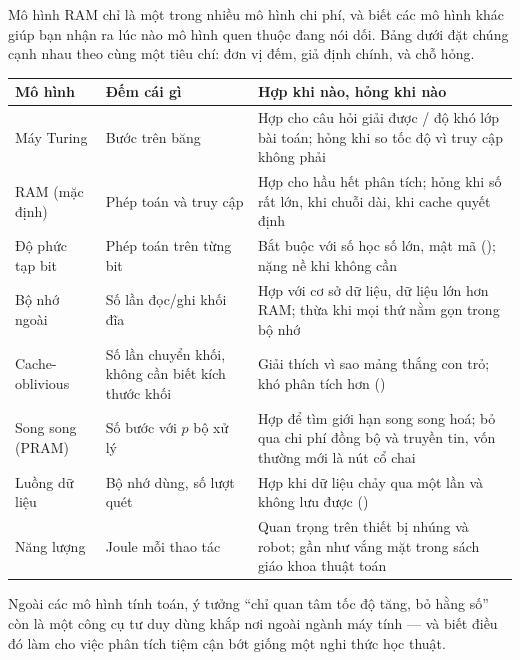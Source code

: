 \documentclass[../../algorithm.tex]{subfiles}
\begin{document}
Mô hình RAM chỉ là một trong nhiều mô hình chi phí, và biết các mô hình khác giúp bạn nhận ra lúc nào mô hình quen thuộc đang nói dối. Bảng dưới đặt chúng cạnh nhau theo cùng một tiêu chí: đơn vị đếm, giả định chính, và chỗ hỏng.

\begin{center}\footnotesize
\begin{tabularx}{\linewidth}{@{}L{3.0cm}L{3.3cm}Y@{}}
\toprule
\textbf{Mô hình} & \textbf{Đếm cái gì} & \textbf{Hợp khi nào, hỏng khi nào}\\
\midrule
Máy Turing & Bước trên băng & Hợp cho câu hỏi giải được / độ khó lớp bài toán; hỏng khi so tốc độ vì truy cập không phải \\
RAM (mặc định) & Phép toán và truy cập & Hợp cho hầu hết phân tích; hỏng khi số rất lớn, khi chuỗi dài, khi cache quyết định\\
Độ phức tạp bit & Phép toán trên từng bit & Bắt buộc với số học số lớn, mật mã (); nặng nề khi không cần\\
Bộ nhớ ngoài & Số lần đọc/ghi khối đĩa & Hợp với cơ sở dữ liệu, dữ liệu lớn hơn RAM; thừa khi mọi thứ nằm gọn trong bộ nhớ\\
Cache-oblivious & Số lần chuyển khối, không cần biết kích thước khối & Giải thích vì sao mảng thắng con trỏ; khó phân tích hơn ()\\
Song song (PRAM) & Số bước với \(p\) bộ xử lý & Hợp để tìm giới hạn song song hoá; bỏ qua chi phí đồng bộ và truyền tin, vốn thường mới là nút cổ chai\\
Luồng dữ liệu & Bộ nhớ dùng, số lượt quét & Hợp khi dữ liệu chảy qua một lần và không lưu được ()\\
Năng lượng & Joule mỗi thao tác & Quan trọng trên thiết bị nhúng và robot; gần như vắng mặt trong sách giáo khoa thuật toán\\
\bottomrule
\end{tabularx}
\end{center}

Ngoài các mô hình tính toán, ý tưởng ``chỉ quan tâm tốc độ tăng, bỏ hằng số'' còn là một công cụ tư duy dùng khắp nơi ngoài ngành máy tính --- và biết điều đó làm cho việc phân tích tiệm cận bớt giống một nghi thức học thuật.
\end{document}
